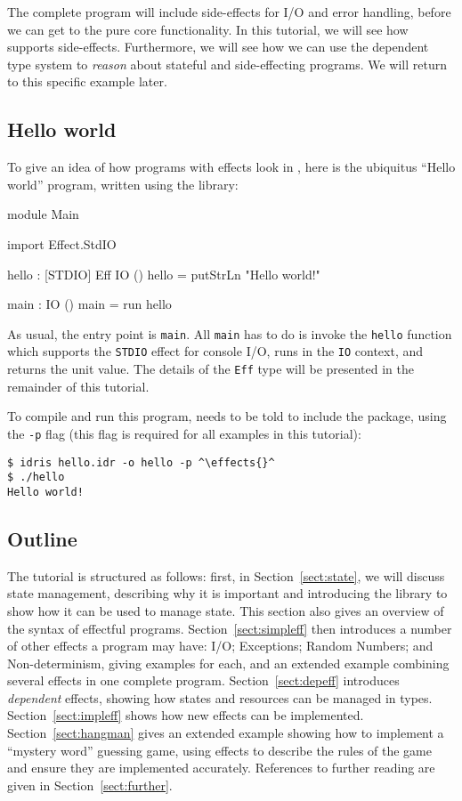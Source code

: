 The complete program will include side-effects for I/O and error handling, before we can get to the pure core functionality.
In this tutorial, we will see how \Idris{} supports side-effects.
Furthermore, we will see how we can use the dependent type system to \emph{reason} about stateful and side-effecting programs.
We will return to this specific example later.

\subsection{Hello world}

To give an idea of how programs with effects look in \Idris{}, here is the ubiquitus ``Hello world'' program, written using the \effects{} library:

\begin{code}
module Main
  
import Effect.StdIO
  
hello : { [STDIO] } Eff IO ()
hello = putStrLn "Hello world!"
  
main : IO ()
main = run hello
\end{code}

\noindent
As usual, the entry point is \texttt{main}.
All \texttt{main} has to do is invoke the \texttt{hello} function which supports the \texttt{STDIO} effect for console I/O, runs in the \texttt{IO} context, and returns the unit value.
The details of the \texttt{Eff} type will be presented in the remainder of this tutorial.

To compile and run this program, \Idris{} needs to be told to include the \effects{} package, using the \texttt{-p} \effects{} flag (this flag is required for all examples in this tutorial):

\begin{lstlisting}[escapechar=^]
$ idris hello.idr -o hello -p ^\effects{}^
$ ./hello
Hello world!
\end{lstlisting}

\subsection{Outline}

The tutorial is structured as follows: first, in Section~\ref{sect:state}, we will discuss state management, describing why it is important and introducing the \effects{} library to show how it can be used to manage state. This section also gives an overview of the syntax of effectful programs.
Section~\ref{sect:simpleff} then introduces a number of other effects a program may have: I/O; Exceptions; Random Numbers; and Non-determinism, giving examples for each, and an extended example combining several effects in one complete program.
Section~\ref{sect:depeff} introduces \emph{dependent} effects, showing how states and resources can be managed in types.
Section~\ref{sect:impleff} shows how new effects can be implemented.
Section~\ref{sect:hangman} gives an extended example showing how to implement a ``mystery word'' guessing game, using effects to describe the rules of the game and ensure they are implemented accurately.
References to further reading are given in Section~\ref{sect:further}.

